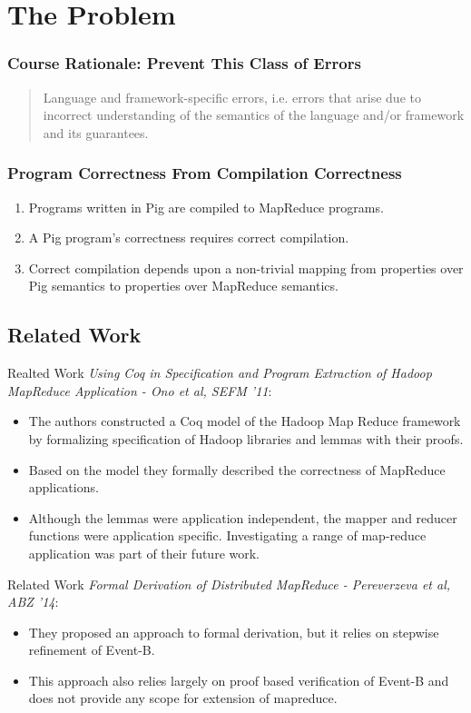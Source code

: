 \section{The Problem}
\begin{frame}
  \frametitle{Course Rationale: Prevent This Class of Errors}
  \begin{quote}
      Language and framework-specific errors, i.e. errors that arise due to
      incorrect understanding of the semantics of the language and/or framework
      and its guarantees.
  \end{quote}
\end{frame}

\begin{frame}
  \frametitle{Program Correctness From Compilation Correctness}
  \begin{enumerate}
    \item Programs written in Pig are compiled to MapReduce programs.
    \item A Pig program's correctness requires correct compilation.
    \item Correct compilation depends upon a non-trivial mapping from
      properties over Pig semantics to properties over MapReduce semantics.
  \end{enumerate}

\end{frame}

\subsection{Related Work}
\begin{frame}{Realted Work}
\emph{Using Coq in Specification and Program Extraction of Hadoop MapReduce Application - Ono et al, SEFM '11}:
\begin{itemize}
	\item The authors constructed a Coq model of the Hadoop Map Reduce framework by formalizing specification of Hadoop libraries and lemmas with their proofs. 
	\item Based on the model they formally described the correctness of MapReduce applications. 
	\item Although the lemmas were application independent, the mapper and reducer functions were application specific. Investigating a range of map-reduce application was part of their future work.
\end{itemize}
\end{frame}

\begin{frame}{Related Work}
 \emph{Formal Derivation of Distributed MapReduce - Pereverzeva et al, ABZ '14}:\begin{itemize}
	\item They proposed an approach to formal derivation, but it relies on stepwise refinement of Event-B. 
	\item This approach also relies largely on proof based verification of Event-B and does not provide any scope for extension of mapreduce.
\end{itemize}
\end{frame}

